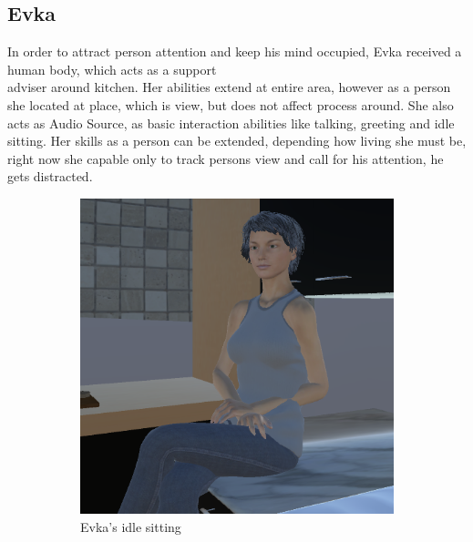 \documentclass[18pt]{article}
\numberwithin{equation}{section} %
\numberwithin{figure}{section} %
\numberwithin{table}{section} %
\begin{document}
	\subsection{Evka}
	In order to attract person attention and keep his mind occupied, Evka received a human body, which acts as a support\\adviser around kitchen. Her abilities extend at entire area, however as a person she located at place, which is  view, but does not affect process around. She also acts as Audio Source, as basic interaction abilities like talking, greeting and idle sitting. Her skills as a person can be extended, depending how living she must be, right now she capable only to track persons view and call for his attention, he gets distracted. \\
	\begin{figure}[H]
		\centering
		\begin{subfigure}{0.4\textwidth}
			\centering
			\includegraphics[width=1\linewidth]{images/Evka_sit_1}
			\caption{Evka's idle sitting}
		\end{subfigure}
		\begin{subfigure}{0.4\textwidth}
			\centering

\end{subfigure}
\end{figure}
\end{document}
